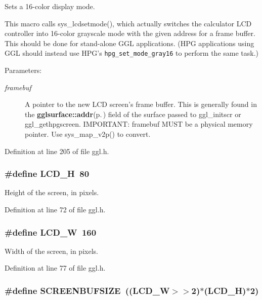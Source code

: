 Sets a 16-color display mode. 

This macro calls sys\_\-lcdsetmode(), which actually switches the calculator LCD controller into 16-color grayscale mode with the given address for a frame buffer. This should be done for stand-alone GGL applications. (HPG applications using GGL should instead use HPG's {\tt hpg\_\-set\_\-mode\_\-gray16} to perform the same task.)

\begin{Desc}
\item[Parameters:]
\begin{description}
\item[{\em framebuf}]A pointer to the new LCD screen's frame buffer. This is generally found in the {\bf gglsurface::addr}{\rm (p.\,\pageref{structgglsurface_o0})} field of the surface passed to ggl\_\-initscr or ggl\_\-gethpgscreen. IMPORTANT: framebuf MUST be a physical memory pointer. Use sys\_\-map\_\-v2p() to convert. \end{description}
\end{Desc}


Definition at line 205 of file ggl.h.
\subsubsection{\setlength{\rightskip}{0pt plus 5cm}\#define LCD\_\-H~80}\label{ggl_8h_a1}


Height of the screen, in pixels. 



Definition at line 72 of file ggl.h.
\subsubsection{\setlength{\rightskip}{0pt plus 5cm}\#define LCD\_\-W~160}\label{ggl_8h_a2}


Width of the screen, in pixels. 



Definition at line 77 of file ggl.h.
\subsubsection{\setlength{\rightskip}{0pt plus 5cm}\#define SCREENBUFSIZE~((LCD\_\-W$>$$>$2)$\ast$(LCD\_\-H)$\ast$2)}\label{ggl_8h_a3}



